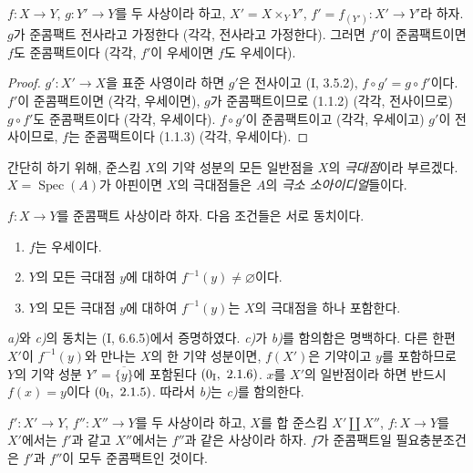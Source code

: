 \begin{corollary}[1.1.4]
\label{IV.1.1.4-fr}
$f:X\to Y$, $g:Y'\to Y$를 두 사상이라 하고,
$X'=X\times_YY'$, $f'=f_{(Y')}:X'\to Y'$라 하자. $g$가 준콤팩트
전사라고 가정한다 (각각, 전사라고 가정한다). 그러면 $f'$이
준콤팩트이면 $f$도 준콤팩트이다 (각각, $f'$이 우세이면 $f$도
우세이다).
\end{corollary}

\begin{proof}
$g':X'\to X$을 표준 사영이라 하면 $g'$은 전사이고 (I, 3.5.2),
$f\circ g'=g\circ f'$이다. $f'$이 준콤팩트이면 (각각, 우세이면),
$g$가 준콤팩트이므로 (1.1.2) (각각, 전사이므로) $g\circ f'$도
준콤팩트이다 (각각, 우세이다). $f\circ g'$이 준콤팩트이고
(각각, 우세이고) $g'$이 전사이므로, $f$는 준콤팩트이다 (1.1.3)
(각각, 우세이다).
\end{proof}


간단히 하기 위해, 준스킴 $X$의 기약 성분의 모든 일반점을 $X$의
\emph{극대점}이라 부르겠다. $X=\operatorname{Spec}(A)$가
아핀이면 $X$의 극대점들은 $A$의 \emph{극소 소아이디얼}들이다.

\begin{proposition}[1.1.5]
\label{IV.1.1.5-fr}
$f:X\to Y$를 준콤팩트 사상이라 하자. 다음 조건들은 서로 동치이다.
\begin{enumerate}
  \item[a)] $f$는 우세이다.
  \item[b)] $Y$의 모든 극대점 $y$에 대하여
  $f^{-1}(y)\neq\varnothing$이다.
  \item[c)] $Y$의 모든 극대점 $y$에 대하여 $f^{-1}(y)$는 $X$의
  극대점을 하나 포함한다.
\end{enumerate}
\end{proposition}

\emph{a)}와 \emph{c)}의 동치는 (I, 6.6.5)에서 증명하였다.
\emph{c)}가 \emph{b)}를 함의함은 명백하다. 다른 한편 $X'$이
$f^{-1}(y)$와 만나는 $X$의 한 기약 성분이면, $f(X')$은 기약이고
$y$를 포함하므로 $Y$의 기약 성분
$Y'=\overline{\{y\}}$에 포함된다 $(0\textsubscript{I},~2.1.6)$.
$x$를 $X'$의 일반점이라 하면 반드시 $f(x)=y$이다
$(0\textsubscript{I},~2.1.5)$. 따라서 \emph{b)}는 \emph{c)}를
함의한다.

\begin{proposition}[1.1.6]
\label{IV.1.1.6-fr}
$f':X'\to Y$, $f'':X''\to Y$를 두 사상이라 하고, $X$를 합 준스킴
$X'\coprod X''$, $f:X\to Y$를 $X'$에서는 $f'$과 같고 $X''$에서는
$f''$과 같은 사상이라 하자. $f$가 준콤팩트일 필요충분조건은
$f'$과 $f''$이 모두 준콤팩트인 것이다.
\end{proposition}

